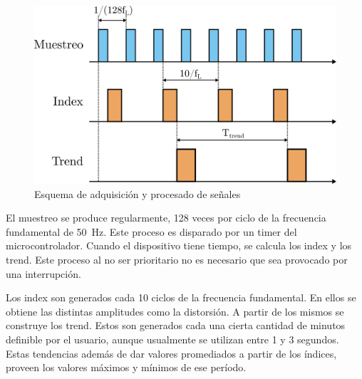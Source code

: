 \documentclass[../et.tex]{subfiles}
\begin{document}
  \begin{figure}[!htbp]
    \centering
    \includegraphics[scale=1.1]{../diagrams/index-trend.png}
    \caption{Esquema de adquisición y procesado de señales}
    \label{fig:index-trend}
  \end{figure}

  El muestreo se produce regularmente, 128 veces por ciclo de la frecuencia fundamental de \SI{50}{Hz}. Este proceso es disparado por un timer del microcontrolador. Cuando el dispositivo tiene tiempo, se calcula los index y los trend. Este proceso al no ser prioritario no es necesario que sea provocado por una interrupción.

  Los index son generados cada 10 ciclos de la frecuencia fundamental. En ellos se obtiene las distintas amplitudes como la distorsión. A partir de los mismos se construye los trend. Estos son generados cada una cierta cantidad de minutos definible por el usuario, aunque usualmente se utilizan entre 1 y 3 segundos. Estas tendencias además de dar valores promediados a partir de los índices, proveen los valores máximos y mínimos de ese período.
\end{document}
